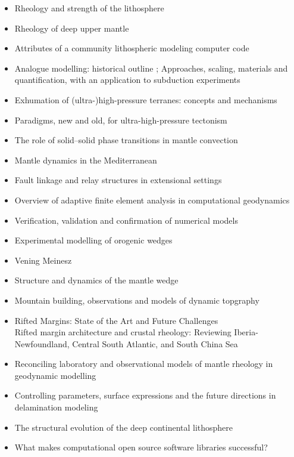 \begin{itemize}
\item Rheology and strength of the lithosphere \cite{kirb83,buro11}
\item Rheology of deep upper mantle \cite{kara10}
\item Attributes of a community lithospheric modeling computer code \cite{comc15}
\item Analogue modelling: historical outline \cite{koyi97}; Approaches, scaling, materials and quantification, with an application to subduction experiments \cite{scst16}
\item Exhumation of (ultra-)high-pressure terranes: concepts and mechanisms \cite{warr13}
\item Paradigms, new and old, for ultra-high-pressure tectonism \cite{hage13}
\item The role of solid–solid phase transitions in mantle convection \cite{fada17}
\item Mantle dynamics in the Mediterranean \cite{faba14}
\item Fault linkage and relay structures in extensional settings \cite{foro16}
\item Overview of adaptive finite element analysis in computational geodynamics \cite{masm13}
\item Verification, validation and confirmation of numerical models \cite{orsb94}
\item Experimental modelling of orogenic wedges \cite{grmd12}
\item Vening Meinesz \cite{vlaa89}
\item Structure and dynamics of the mantle wedge \cite{vank03}
\item Mountain building, observations and models of dynamic topgraphy \cite{flgm13,fabc13}
\item Rifted Margins: State of the Art and Future Challenges \cite{pema19}\\
      Rifted margin architecture and crustal rheology: Reviewing
Iberia-Newfoundland, Central South Atlantic, and South China Sea \cite{brhc17}
\item Reconciling laboratory and observational models of mantle rheology in geodynamic modelling \cite{king16}
\item Controlling parameters, surface expressions and the future directions in delamination modeling \cite{goue18}
\item The structural evolution of the deep continental lithosphere \cite{comm17}
\item What makes computational open source software libraries successful? \cite{bahe13}

\end{itemize}
